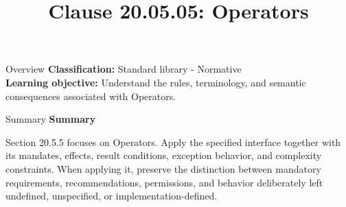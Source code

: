 \documentclass[10pt,letterpaper]{article}
\title{Clause 20.05.05: Operators}
\author{}
\date{}
\begin{document}
\maketitle
\begin{CornellOverviewBox}{Overview}
\textbf{Classification:} Standard library - Normative\\[2pt]
\textbf{Learning objective:} Understand the rules, terminology, and semantic consequences associated with Operators.
\end{CornellOverviewBox}\begin{CornellSummaryBox}{Summary}
{\sffamily\bfseries\color{Accent} Summary}\par\vspace{3pt}Section 20.5.5 focuses on Operators. Apply the specified interface together with its mandates, effects, result conditions, exception behavior, and complexity constraints. When applying it, preserve the distinction between mandatory requirements, recommendations, permissions, and behavior deliberately left undefined, unspecified, or implementation-defined.
\end{CornellSummaryBox}
\end{document}
